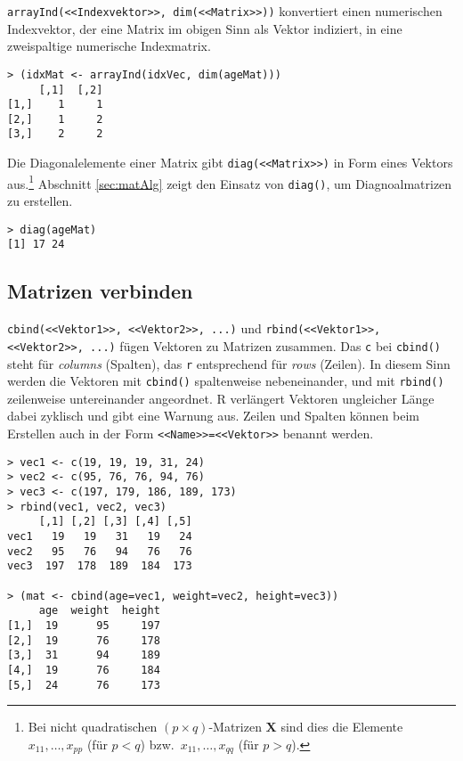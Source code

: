 \lstinline!arrayInd(<<Indexvektor>>, dim(<<Matrix>>))! konvertiert einen numerischen Indexvektor, der eine Matrix im obigen Sinn als Vektor indiziert, in eine zweispaltige numerische Indexmatrix.
\begin{lstlisting}
> (idxMat <- arrayInd(idxVec, dim(ageMat)))
     [,1]  [,2]
[1,]    1     1
[2,]    1     2
[3,]    2     2
\end{lstlisting}

Die Diagonalelemente einer Matrix gibt \lstinline!diag(<<Matrix>>)! in Form eines Vektors aus.\footnote{Bei nicht quadratischen $(p \times q)$-Matrizen $\bm{X}$ sind dies die Elemente $x_{11}, \ldots, x_{pp}$ (für $p < q$) bzw.\ $x_{11}, \ldots, x_{qq}$ (für $p > q$).} Abschnitt \ref{sec:matAlg} zeigt den Einsatz von \lstinline!diag()!, um Diagnoalmatrizen zu erstellen.
\begin{lstlisting}
> diag(ageMat)
[1] 17 24
\end{lstlisting}

\subsection{Matrizen verbinden}
\label{sec:matCbind}

\lstinline!cbind(<<Vektor1>>, <<Vektor2>>, ...)! und \lstinline!rbind(<<Vektor1>>, <<Vektor2>>, ...)! fügen Vektoren zu Matrizen zusammen. Das \lstinline!c! bei \lstinline!cbind()! steht für \emph{columns} (Spalten), das \lstinline!r! entsprechend für \emph{rows} (Zeilen). In diesem Sinn werden die Vektoren mit \lstinline!cbind()! spaltenweise nebeneinander, und mit \lstinline!rbind()! zeilenweise untereinander angeordnet. R verlängert Vektoren ungleicher Länge dabei zyklisch und gibt eine Warnung aus. Zeilen und Spalten können beim Erstellen auch in der Form \lstinline!<<Name>>=<<Vektor>>! benannt werden.
\begin{lstlisting}
> vec1 <- c(19, 19, 19, 31, 24)
> vec2 <- c(95, 76, 76, 94, 76)
> vec3 <- c(197, 179, 186, 189, 173)
> rbind(vec1, vec2, vec3)
     [,1] [,2] [,3] [,4] [,5]
vec1   19   19   31   19   24
vec2   95   76   94   76   76
vec3  197  178  189  184  173

> (mat <- cbind(age=vec1, weight=vec2, height=vec3))
     age  weight  height
[1,]  19      95     197
[2,]  19      76     178
[3,]  31      94     189
[4,]  19      76     184
[5,]  24      76     173
\end{lstlisting}

